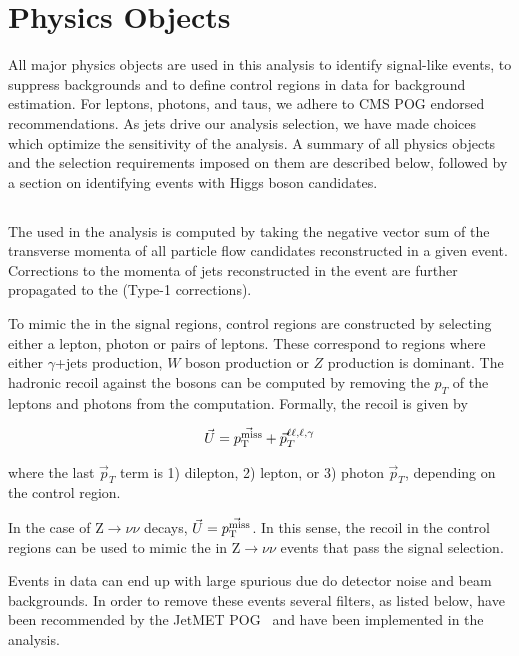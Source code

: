 \clearpage
\section{Physics Objects}
All major physics objects are used in this analysis to identify
signal-like events, to suppress backgrounds and to define control
regions in data for background estimation.  For leptons, photons, and taus, we
adhere to CMS POG endorsed recommendations. 
As jets drive our analysis selection, we have made choices which optimize the sensitivity of the analysis.
A summary of all physics objects and the selection requirements imposed on them are described below, followed by a section on identifying events with Higgs boson candidates. 

\subsection{\MET}\label{subsec:MET}
The \MET used in the analysis is computed by taking the negative vector sum of the transverse momenta of all particle flow candidates reconstructed in a given event.
Corrections to the momenta of jets reconstructed in the event are further propagated to the \MET (Type-1 corrections).

To mimic the \MET in the signal regions, control regions are constructed by selecting either a lepton, photon or pairs of
leptons. These correspond to regions where either $\gamma$+jets production, $W$ boson production or $Z$ production is dominant.
The hadronic recoil against the bosons can be computed by removing the $p_T$ of the leptons and photons from the \MET computation.
Formally, the recoil is given by

\begin{gather}
  \vec{U} = \vec{p_{\mathrm{T}}^{\text{miss}}} + \vec{p}_{T}^{\ell\ell,\ell,\gamma}
\end{gather}

where the last $\vec{p}_T$ term is 1) dilepton, 2) lepton, or 3) photon $\vec{p}_T$, depending on the control region.

In the case of Z$\rightarrow\nu\nu$ decays, $\vec{U}=\vec{p_{\mathrm{T}}^{\text{miss}}}$. In this sense, the recoil in the control regions
can be used to mimic the \MET in Z$\rightarrow\nu\nu$ events that pass the signal selection.

Events in data can end up with large spurious \MET due do detector noise and beam backgrounds. In order to remove these events several \MET filters, as listed below, 
have been recommended by the JetMET POG~\cite{METFILTERS_TWIKI} and have been implemented in the analysis.

